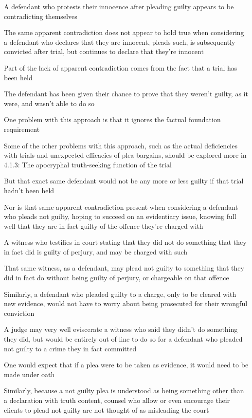 A defendant who protests their innocence after pleading guilty appears to be contradicting themselves

The same apparent contradiction does not appear to hold true when considering a defendant who declares that they are innocent, pleads such, is subsequently convicted after trial, but continues to declare that they're innocent

Part of the lack of apparent contradiction comes from the fact that a trial has been held

The defendant has been given their chance to prove that they weren't guilty, as it were, and wasn't able to do so

One problem with this approach is that it ignores the factual foundation requirement

Some of the other problems with this approach, such as the actual deficiencies with trials and unexpected efficacies of plea bargains, should be explored more in 4.1.3: The apocryphal truth-seeking function of the trial

But that exact same defendant would not be any more or less guilty if that trial hadn't been held

Nor is that same apparent contradiction present when considering a defendant who pleads not guilty, hoping to succeed on an evidentiary issue, knowing full well that they are in fact guilty of the offence they're charged with

A witness who testifies in court stating that they did not do something that they in fact did is guilty of perjury, and may be charged with such

That same witness, as a defendant, may plead not guilty to something that they did in fact do without being guilty of perjury, or chargeable on that offence

Similarly, a defendant who pleaded guilty to a charge, only to be cleared with new evidence, would not have to worry about being prosecuted for their wrongful conviction

A judge may very well eviscerate a witness who said they didn't do something they did, but would be entirely out of line to do so for a defendant who pleaded not guilty to a crime they in fact committed

One would expect that if a plea were to be taken as evidence, it would need to be made under oath

Similarly, because a not guilty plea is understood as being something other than a declaration with truth content, counsel who allow or even encourage their clients to plead not guilty are not thought of as misleading the court

